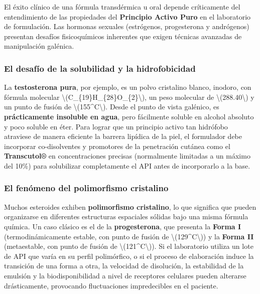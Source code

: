 \documentclass[
  spanish,
]{article}
\begin{document}
El éxito clínico de una fórmula transdérmica u oral depende críticamente del entendimiento de las propiedades del \textbf{Principio Activo Puro} en el laboratorio de formulación. Las hormonas sexuales (estrógenos, progesterona y andrógenos) presentan desafíos fisicoquímicos inherentes que exigen técnicas avanzadas de manipulación galénica.

\subsubsection{El desafío de la solubilidad y la hidrofobicidad}\label{el-desafuxedo-de-la-solubilidad-y-la-hidrofobicidad}

La \textbf{testosterona pura}, por ejemplo, es un polvo cristalino blanco, inodoro, con fórmula molecular \textbackslash(C\_\{19\}H\_\{28\}O\_\{2\}\textbackslash), un peso molecular de \textbackslash(288.40\textbackslash) y un punto de fusión de \textbackslash(155\^{}\circ C\textbackslash). Desde el punto de vista galénico, es \textbf{prácticamente insoluble en agua}, pero fácilmente soluble en alcohol absoluto y poco soluble en éter. Para lograr que un principio activo tan hidrófobo atraviese de manera eficiente la barrera lipídica de la piel, el formulador debe incorporar co-disolventes y promotores de la penetración cutánea como el \textbf{Transcutol®} en concentraciones precisas (normalmente limitadas a un máximo del 10\%) para solubilizar completamente el API antes de incorporarlo a la base.

\subsubsection{El fenómeno del polimorfismo cristalino}\label{el-fenuxf3meno-del-polimorfismo-cristalino}

Muchos esteroides exhiben \textbf{polimorfismo cristalino}, lo que significa que pueden organizarse en diferentes estructuras espaciales sólidas bajo una misma fórmula química. Un caso clásico es el de la \textbf{progesterona}, que presenta la \textbf{Forma I} (termodinámicamente estable, con punto de fusión de \textbackslash(129\^{}\circ C\textbackslash)) y la \textbf{Forma II} (metaestable, con punto de fusión de \textbackslash(121\^{}\circ C\textbackslash)). Si el laboratorio utiliza un lote de API que varía en su perfil polimórfico, o si el proceso de elaboración induce la transición de una forma a otra, la velocidad de disolución, la estabilidad de la emulsión y la biodisponibilidad a nivel de receptores celulares pueden alterarse drásticamente, provocando fluctuaciones impredecibles en el paciente.
\end{document}

